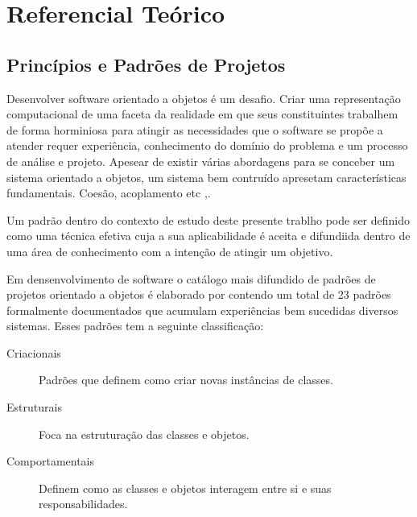\chapter{Referencial Teórico}

\section{Princípios e Padrões de Projetos}

Desenvolver software orientado a objetos é um desafio. Criar uma representação
computacional de uma faceta da realidade em que seus constituintes trabalhem de
forma horminiosa para atingir as necessidades que o software se propõe a
atender requer experiência, conhecimento do domínio do problema e um processo de
análise e projeto. Apesear de existir várias abordagens para se conceber um
sistema orientado a objetos\cite{evans2004ddd},\cite{gomma11} um sistema bem
contruído apresetam características fundamentais. Coesão, acoplamento etc
\cite{demarco},\cite{page-jones}.


Um padrão dentro do contexto de estudo deste presente trablho pode ser definido
como uma técnica efetiva cuja a sua aplicabilidade é aceita e difundiida dentro
de uma área de conhecimento com a intenção de atingir um
objetivo\cite{MetskerWake06}.

Em densenvolvimento de software o catálogo mais difundido de padrões de projetos
orientado a objetos é elaborado por  contendo um total de 23
padrões formalmente documentados que acumulam experiências bem sucedidas 
diversos sistemas. Esses padrões tem a seguinte classificação:


\begin{description}
\item[Criacionais] Padrões que definem como criar novas instâncias de classes.
\item[Estruturais] Foca na estruturação das classes e objetos.
\item[Comportamentais] Definem como as classes e objetos interagem entre si e
suas responsabilidades.
\end{description}

